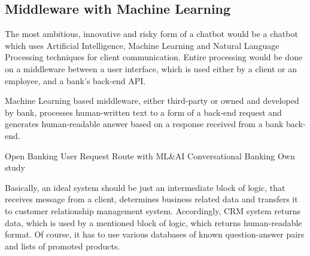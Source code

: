 \subsection*{Middleware with Machine Learning}

The most ambitious, innovative and risky form of a chatbot would be a chatbot which uses Artificial Intelligence, Machine Learning and Natural Language Processing techniques for client communication.
Entire processing would be done on a middleware between a user interface, which is used either by a client or an employee, and a bank's back-end API.

Machine Learning based middleware, either third-party or owned and developed by bank, processes human-written text to a form of a back-end request and generates human-readable answer based on a response received from a bank back-end.

\mttable
{Open Banking User Request Route with ML\&AI Conversational Banking}
{Own study}
{
}

Basically, an ideal system should be just an intermediate block of logic, that receives message from a client, determines business related data and transfers it to customer relationship management system.
Accordingly, CRM system returns data, which is used by a mentioned block of logic, which returns human-readable format.
Of course, it has to use various databases of known question-answer pairs and lists of promoted products.

